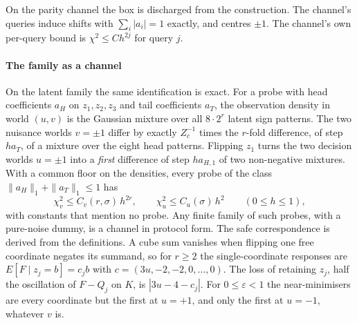 On the parity channel the box is discharged from the construction. The channel's queries
induce shifts with $\sum_{i}|a_{i}|=1$ exactly, and centres $\pm1$. The channel's own
per-query bound is $\chi^2\le Ch^{2j}$ for query $j$.


\paragraph{The family as a channel} On the latent family the same identification is exact. For
a probe with head coefficients $a_{H}$ on $z_{1},z_{2},z_{3}$ and tail coefficients $a_{T}$, the
observation density in world $(u,v)$ is the Gaussian mixture over all $8\cdot2^{r}$ latent sign
patterns. The two nuisance worlds $v=\pm1$ differ by exactly
$Z_{c}^{-1}$ times the $r$-fold difference, of step $ha_{T}$, of a mixture over the eight head
patterns. Flipping $z_{1}$ turns the two decision worlds $u=\pm1$ into a \emph{first}
difference of step $h a_{H,1}$ of two non-negative mixtures. With a common floor on the
densities, every probe of the class $\|a_{H}\|_{1}+\|a_{T}\|_{1}\le1$ has
\[
\chi^{2}_{v}\le C_{v}(r,\sigma)\,h^{2r},\qquad \chi^{2}_{u}\le C_{u}(\sigma)\,h^{2}
\qquad(0\le h\le1),
\]
with constants that mention no probe. Any finite family of such probes, with a pure-noise dummy,
is a channel in protocol form. The safe correspondence is derived from the definitions. A cube
sum vanishes when flipping one free coordinate negates its summand, so for $r\ge2$ the
single-coordinate responses are $E[F\mid z_{j}=b]=c_{j}b$ with $c=(3u,-2,-2,0,\dots,0)$. The loss of
retaining $z_{j}$, half the oscillation of $F-Q_{j}$ on $K$, is $|3u-4-c_{j}|$. For
$0\le\varepsilon<1$ the near-minimisers are every coordinate but the first at $u=+1$, and only the
first at $u=-1$, whatever $v$ is.


